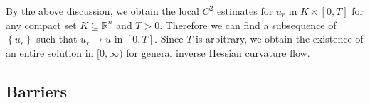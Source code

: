 \documentclass[reqno]{amsart}
\theoremstyle{remark}
\theoremstyle{definition}
\numberwithin{equation}{section}
\begin{document}

By the above discussion, we obtain the local $C^2$ estimates for $u_r$ in $K \times [0, T]$ for any compact set $K \subseteq \mathbb{R}^n$ and $T>0$. Therefore we can find a subsequence of $\left\{ u_r \right\}$ such that $u_r \rightarrow u$ in $[0, T]$. Since $T$ is arbitrary, we obtain the existence of an entire solution in $[0, \infty)$ for general inverse Hessian curvature flow.


\subsection{Barriers}\label{Barriers}
\end{document}
